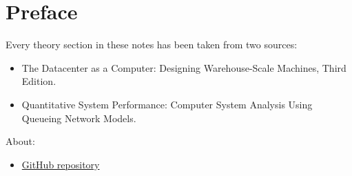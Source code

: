 \section*{Preface}

Every theory section in these notes has been taken from two sources:
\begin{itemize}
    \item The Datacenter as a Computer: Designing Warehouse-Scale Machines, Third Edition.\cite{barroso2022datacenter}

    \item Quantitative System Performance: Computer System Analysis Using Queueing Network Models.\cite{lazowska1984quantitative}
\end{itemize}
About:
\begin{itemize}
    \item[\faIcon{github}] \href{https://github.com/PoliMI-HPC-E-notes-projects-AndreVale69/HPC-E-PoliMI-university-notes}{GitHub repository}
\end{itemize}